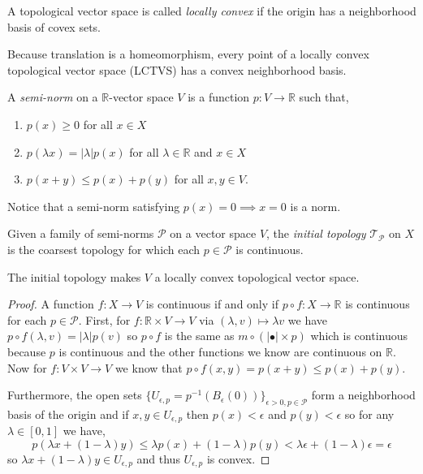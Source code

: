 \documentclass[12pt]{article}
\newcommand{\R}{\mathbb{R}}
\begin{document}
\begin{defn}
A topological vector space is called \textit{locally convex} if the origin has a neighborhood basis of covex sets.
\end{defn}

\begin{rmk}
Because translation is a homeomorphism, every point of a locally convex topological vector space (LCTVS) has a convex neighborhood basis.
\end{rmk}

\begin{defn}
A \textit{semi-norm} on a $\R$-vector space $V$ is a function $p : V \to \R$ such that,
\begin{enumerate}
\item $p(x) \ge 0$ for all $x \in X$
\item $p(\lambda x) = |\lambda | p(x)$ for all $\lambda \in \R$ and $x \in X$
\item $p(x + y) \le p(x) + p(y)$ for all $x,y \in V$.
\end{enumerate}
Notice that a semi-norm satisfying $p(x) = 0 \implies x = 0$ is a norm.
\end{defn}

\begin{defn}
Given a family of semi-norms $\mathcal{P}$ on a vector space $V$, the \textit{initial topology} $\mathcal{T}_{\mathcal{P}}$ on $X$ is the coarsest topology for which each $p \in \mathcal{P}$ is continuous. 
\end{defn}

\begin{prop}
The initial topology makes $V$ a locally convex topological vector space.
\end{prop}

\begin{proof}
A function $f : X \to V$ is continuous if and only if $p \circ f : X \to \R$ is continuous for each $p \in \mathcal{P}$. First, for $f : \R \times V \to V$ via $(\lambda, v) \mapsto  \lambda v$ we have $p \circ f(\lambda, v) = |\lambda| p(v)$ so $p \circ f$ is the same as $m \circ (| \bullet | \times p)$ which is continuous because $p$ is continuous and the other functions we know are continuous on $\R$. Now for $f : V \times V \to V$ we know that $p \circ f(x, y) = p(x + y) \le p(x) + p(y)$.

Furthermore, the open sets $\{U_{\epsilon, p} = p^{-1}(B_\epsilon(0))\}_{\epsilon > 0, p \in \mathcal{P}}$ form a neighborhood basis of the origin and if $x,y \in U_{\epsilon, p}$ then $p(x) < \epsilon$ and $p(y) < \epsilon$ so for any $\lambda \in [0,1]$ we have, 
\[ p(\lambda x + (1 - \lambda) y) \le \lambda p(x) + (1 - \lambda) p(y) < \lambda \epsilon + (1 - \lambda) \epsilon = \epsilon \]
so $\lambda x + (1 - \lambda) y \in U_{\epsilon, p}$ and thus $U_{\epsilon, p}$ is convex.
\end{proof}
\end{document}
